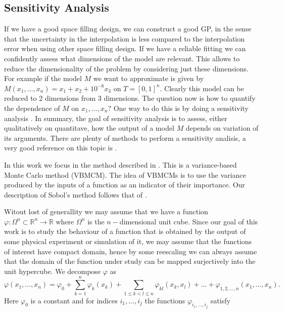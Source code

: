 \documentclass[12pt]{book}
\begin{document}
\subsection{Sensitivity Analysis}
 
If we have a good space filling design, we can construct a good GP, in the sense that 
the uncertainty in the interpolation is less compared to the interpolation error when
using other space filling design. 
If we have a reliable fitting we can confidently assess what dimensions of the model are relevant.
This allows to reduce the dimensionality of the problem by considering just these dimensions.
For 
example if the model $M$ we want to approximate is given  by $M(x_{1},\ldots,x_{n})=x_{1}+x_{2}+10^{-8}x_{3}$ 
on $T=[0,1]^{n}$. Clearly this model can be reduced to   2 dimensions from 3 dimensions. 
The question  now is how to quantify the 
dependence  of $M$ on $x_{1},\ldots,x_{n}$? One way to do this is by doing a 
sensitivity analysis . In summary, the goal of 
sensitivity analysis is to assess, either qualitatively on quantitave, how
the output of a model $M$ depends on variation of its arguments. There are plenty of 
methods to perform a sensitivity analisis, a very good reference on this topic is
\cite{saltelli2000sensitivity}.




In this work we  focus in
the method  described in \cite{sobol1993sensitivity}. This  is a variance-based Monte Carlo method (VBMCM).
The idea of  VBMCMs is to use the variance produced by  the inputs of a function as an indicator of 
their importance.
Our description of Sobol's method follows that of \cite{saltelli2000sensitivity}.


Witout lost of generallity we may assume that we have a function 
$\varphi: \Omega^{n}\subset\mathbb{R}^{n}\longrightarrow \mathbb{R}$ where $\Omega^{n}$ is the $n-$dimensional
unit cube. Since our goal of this work is to study the behaviour of a function that is obtained by the output
of some physical experiment or simulation of it, we may assume that the functions of interest 
 have  compact domain, hence by some reescaling we can always assume that the domain of the function
under study can be mapped surjectively into the unit hypercube. We decompose $\varphi$ as 
\begin{equation*}
\varphi(x_{1},\ldots,x_{n})=\varphi_{0}+\sum_{k=1}^{n}\varphi_{k}(x_{k})+
\sum_{1\leq k< l\leq n}\varphi_{kl}(x_{k},x_{l})+\ldots+
\varphi_{1,2,\ldots,n}(x_{1},\ldots,x_{n}).
\end{equation*}
Here $\varphi_{0}$ is a constant and for indices $i_{1},\ldots,i_{j}$ the functions
$\varphi_{i_{1},\ldots,i_{j}}$ satisfy
\end{document}
